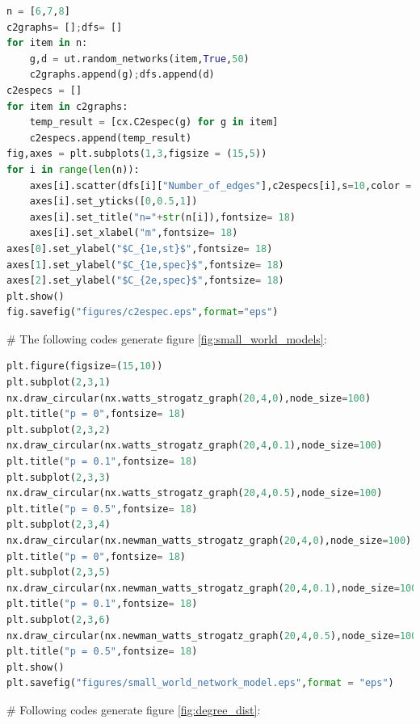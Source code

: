 \documentclass[12pt]{article}
\begin{document}
\begin{lstlisting}[breaklines=true,language=Python]
n = [6,7,8]
c2graphs= [];dfs= []
for item in n:
    g,d = ut.random_networks(item,True,50)
    c2graphs.append(g);dfs.append(d)
c2especs = []
for item in c2graphs:
    temp_result = [cx.C2espec(g) for g in item]
    c2especs.append(temp_result)
fig,axes = plt.subplots(1,3,figsize = (15,5))
for i in range(len(n)):
    axes[i].scatter(dfs[i]["Number_of_edges"],c2especs[i],s=10,color = "black")
    axes[i].set_yticks([0,0.5,1])
    axes[i].set_title("n="+str(n[i]),fontsize= 18)
    axes[i].set_xlabel("m",fontsize= 18)
axes[0].set_ylabel("$C_{1e,st}$",fontsize= 18)
axes[1].set_ylabel("$C_{1e,spec}$",fontsize= 18)
axes[2].set_ylabel("$C_{2e,spec}$",fontsize= 18)
plt.show()
fig.savefig("figures/c2espec.eps",format="eps")
\end{lstlisting}
\noindent
\newline
\# The following codes generate figure \ref{fig:small_world_models}:
\begin{lstlisting}[breaklines=true,language=Python]
plt.figure(figsize=(15,10))
plt.subplot(2,3,1)
nx.draw_circular(nx.watts_strogatz_graph(20,4,0),node_size=100)
plt.title("p = 0",fontsize= 18)
plt.subplot(2,3,2)
nx.draw_circular(nx.watts_strogatz_graph(20,4,0.1),node_size=100)
plt.title("p = 0.1",fontsize= 18)
plt.subplot(2,3,3)
nx.draw_circular(nx.watts_strogatz_graph(20,4,0.5),node_size=100)
plt.title("p = 0.5",fontsize= 18)
plt.subplot(2,3,4)
nx.draw_circular(nx.newman_watts_strogatz_graph(20,4,0),node_size=100)
plt.title("p = 0",fontsize= 18)
plt.subplot(2,3,5)
nx.draw_circular(nx.newman_watts_strogatz_graph(20,4,0.1),node_size=100)
plt.title("p = 0.1",fontsize= 18)
plt.subplot(2,3,6)
nx.draw_circular(nx.newman_watts_strogatz_graph(20,4,0.5),node_size=100)
plt.title("p = 0.5",fontsize= 18)
plt.show()
plt.savefig("figures/small_world_network_model.eps",format = "eps")
\end{lstlisting}
\noindent
\newline
\# Following codes generate figure \ref{fig:degree_dist}:
\end{document}
